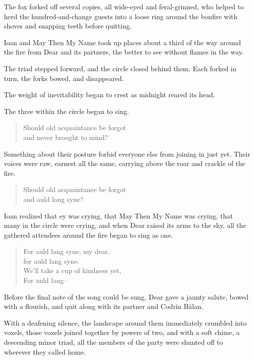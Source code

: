 The fox forked off several copies, all wide-eyed and feral-grinned, who helped to herd the hundred-and-change guests into a loose ring around the bonfire with shoves and snapping teeth before quitting.

Ioan and May Then My Name took up places about a third of the way around the fire from Dear and its partners, the better to see without flames in the way.

The triad stepped forward, and the circle closed behind them. Each forked in turn, the forks bowed, and disappeared.

The weight of inevitability began to crest as midnight reared its head.

The three within the circle began to sing.

\begin{quote}
Should old acquaintance be forgot\\
and never brought to mind?
\end{quote}

Something about their posture forbid everyone else from joining in just yet. Their voices were raw, earnest all the same, carrying above the roar and crackle of the fire.

\begin{quote}
Should old acquaintance be forgot\\
and auld lang syne?
\end{quote}

Ioan realized that ey was crying, that May Then My Name was crying, that many in the circle were crying, and when Dear raised its arms to the sky, all the gathered attendees around the fire began to sing as one.

\begin{quote}
For auld lang syne, my dear,\\
for auld lang syne.\\
We'll take a cup of kindness yet,\\
For auld lang--
\end{quote}

Before the final note of the song could be sung, Dear gave a jaunty salute, bowed with a flourish, and quit along with its partner and Codrin Bălan.

With a deafening silence, the landscape around them immediately crumbled into voxels, those voxels joined together by powers of two, and with a soft chime, a descending minor triad, all the members of the party were shunted off to wherever they called home.

